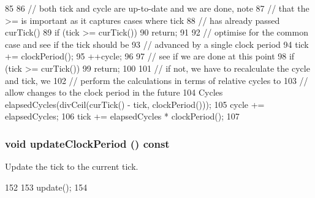 \begin{DoxyCode}
85     {
86         // both tick and cycle are up-to-date and we are done, note
87         // that the >= is important as it captures cases where tick
88         // has already passed curTick()
89         if (tick >= curTick())
90             return;
91 
92         // optimise for the common case and see if the tick should be
93         // advanced by a single clock period
94         tick += clockPeriod();
95         ++cycle;
96 
97         // see if we are done at this point
98         if (tick >= curTick())
99             return;
100 
101         // if not, we have to recalculate the cycle and tick, we
102         // perform the calculations in terms of relative cycles to
103         // allow changes to the clock period in the future
104         Cycles elapsedCycles(divCeil(curTick() - tick, clockPeriod()));
105         cycle += elapsedCycles;
106         tick += elapsedCycles * clockPeriod();
107     }
\end{DoxyCode}
\hypertarget{classClockedObject_a2b1ce4e5fff654f673292b09c44780c0}{
\subsubsection[{updateClockPeriod}]{\setlength{\rightskip}{0pt plus 5cm}void updateClockPeriod () const}}
\label{classClockedObject_a2b1ce4e5fff654f673292b09c44780c0}
Update the tick to the current tick. 


\begin{DoxyCode}
152     {
153         update();
154     }
\end{DoxyCode}


